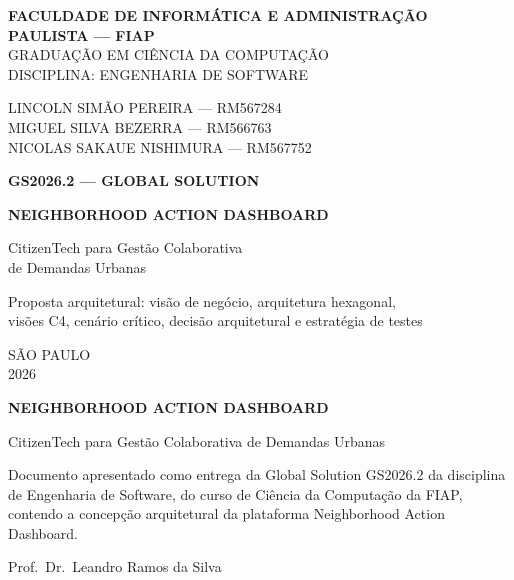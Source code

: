 \documentclass[12pt,a4paper,oneside]{article}
\begin{document}
\onehalfspacing

\thispagestyle{empty}
\begin{center}
{\large\bfseries FACULDADE DE INFORMÁTICA E ADMINISTRAÇÃO PAULISTA — FIAP}\\[2pt]
{\normalsize GRADUAÇÃO EM CIÊNCIA DA COMPUTAÇÃO}\\[2pt]
{\normalsize DISCIPLINA: ENGENHARIA DE SOFTWARE}

\vspace{1.2cm}
{\normalsize
LINCOLN SIMÃO PEREIRA — RM567284\\
MIGUEL SILVA BEZERRA — RM566763\\
NICOLAS SAKAUE NISHIMURA — RM567752\par}

\vspace{2.4cm}
{\normalsize\bfseries GS2026.2 — GLOBAL SOLUTION\par}
\vspace{0.5cm}
{\LARGE\bfseries NEIGHBORHOOD ACTION DASHBOARD\par}
\vspace{0.5cm}
{\large CitizenTech para Gestão Colaborativa\\de Demandas Urbanas\par}
\vspace{0.6cm}
{\normalsize Proposta arquitetural: visão de negócio, arquitetura hexagonal,\\
visões C4, cenário crítico, decisão arquitetural e estratégia de testes\par}

\vfill
{\normalsize SÃO PAULO\\2026\par}
\end{center}
\newpage

\thispagestyle{empty}
\begin{center}
{\large\bfseries NEIGHBORHOOD ACTION DASHBOARD\par}
\vspace{0.3cm}
{\normalsize CitizenTech para Gestão Colaborativa de Demandas Urbanas\par}
\end{center}

\vspace{1.2cm}
\begin{flushright}
\begin{minipage}{0.56\textwidth}
\singlespacing\small
Documento apresentado como entrega da Global Solution GS2026.2 da disciplina de
Engenharia de Software, do curso de Ciência da Computação da FIAP, contendo a
concepção arquitetural da plataforma Neighborhood Action Dashboard.

\vspace{6pt}
Prof.\ Dr.\ Leandro Ramos da Silva
\end{minipage}
\end{flushright}
\end{document}
